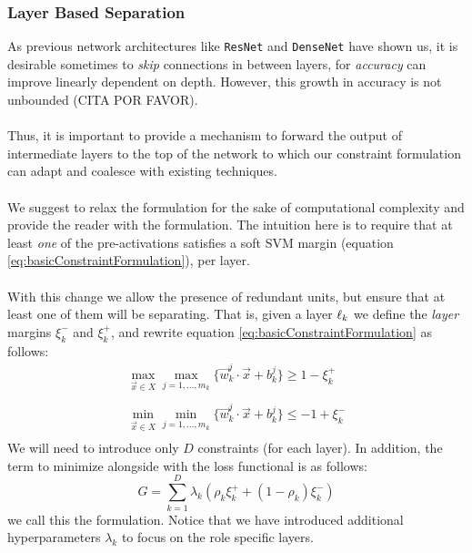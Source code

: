 \subsubsection{Layer Based Separation \SepLayer}

As previous network architectures like \texttt{ResNet} and \texttt{DenseNet} have shown us, it is desirable sometimes to \emph{skip} connections in between layers, for \emph{accuracy} can improve linearly dependent on depth. However, this growth in accuracy is not unbounded (CITA POR FAVOR). 
\\\\
Thus, it is important to provide a mechanism to forward the output of intermediate layers to the top of the network to which our constraint formulation can adapt and coalesce with existing techniques.  
\\\\
We suggest to relax the \SepUnit formulation for the sake of computational complexity and provide the reader with the \SepLayer formulation. The intuition here is to require that at least \emph{one} of the pre-activations satisfies a soft SVM margin (equation  \ref{eq:basicConstraintFormulation}), per layer.  
\\\\
With this change we allow the presence of redundant units, but ensure that at least one of them will be separating. That is, given a layer $\ell_k$ we define the \emph{layer} margins $\xi^{-}_k$ and $\xi^{+}_k$, and rewrite equation \ref{eq:basicConstraintFormulation} as follows:
\begin{equation}\label{eq:layerSeparationConstraint}
\begin{array}{lcl}
    \displaystyle\max_{\vec{x}\in{X}}\max_{j=1,\ldots,m_k}\{\vec{w}^j_k\cdot\vec{x}+b^j_k\}\geq 1-\xi^{+}_k\\\\
    \displaystyle\min_{\vec{x}\in{X}}\min_{j=1,\ldots,m_k}\{\vec{w}^j_k\cdot\vec{x}+b^j_k\}\leq -1+\xi^{-}_k\\
\end{array}    
\end{equation}
We will need to introduce only $D$ constraints (for each layer). In addition, the term to minimize alongside with the loss functional is as follows:
\begin{equation}\label{eq:constraintLossForLayerSeparation}
    G = \sum_{k=1}^{D}\lambda_k(\rho_{k}\xi^{+}_{k}+(1-\rho_{k})\xi^{-}_{k})
\end{equation}
we call this the \SepLayer formulation. Notice that we have introduced additional hyperparameters $\lambda_k$ to focus on the role specific layers.   

